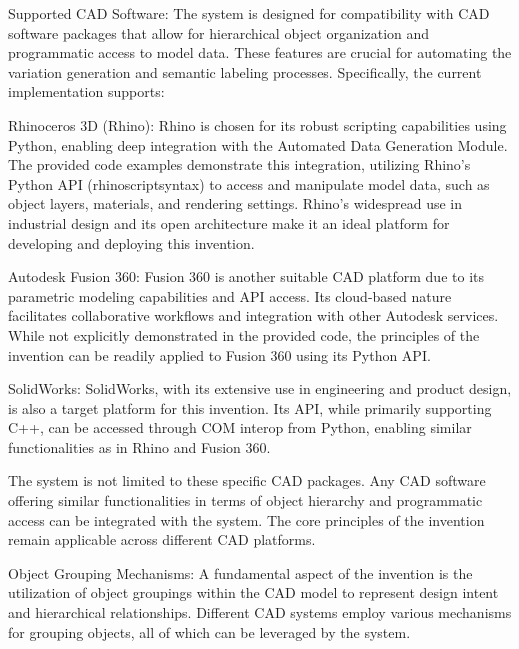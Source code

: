 \documentclass{article}
\begin{document}
Supported CAD Software: The system is designed for compatibility with CAD software packages that allow for hierarchical object organization and programmatic access to model data. These features are crucial for automating the variation generation and semantic labeling processes. Specifically, the current implementation supports:

Rhinoceros 3D (Rhino): Rhino is chosen for its robust scripting capabilities using Python, enabling deep integration with the Automated Data Generation Module. The provided code examples demonstrate this integration, utilizing Rhino's Python API (rhinoscriptsyntax) to access and manipulate model data, such as object layers, materials, and rendering settings. Rhino’s widespread use in industrial design and its open architecture make it an ideal platform for developing and deploying this invention.

Autodesk Fusion 360: Fusion 360 is another suitable CAD platform due to its parametric modeling capabilities and API access. Its cloud-based nature facilitates collaborative workflows and integration with other Autodesk services. While not explicitly demonstrated in the provided code, the principles of the invention can be readily applied to Fusion 360 using its Python API.

SolidWorks: SolidWorks, with its extensive use in engineering and product design, is also a target platform for this invention. Its API, while primarily supporting C++, can be accessed through COM interop from Python, enabling similar functionalities as in Rhino and Fusion 360.

The system is not limited to these specific CAD packages. Any CAD software offering similar functionalities in terms of object hierarchy and programmatic access can be integrated with the system. The core principles of the invention remain applicable across different CAD platforms.

Object Grouping Mechanisms: A fundamental aspect of the invention is the utilization of object groupings within the CAD model to represent design intent and hierarchical relationships. Different CAD systems employ various mechanisms for grouping objects, all of which can be leveraged by the system.
\end{document}
